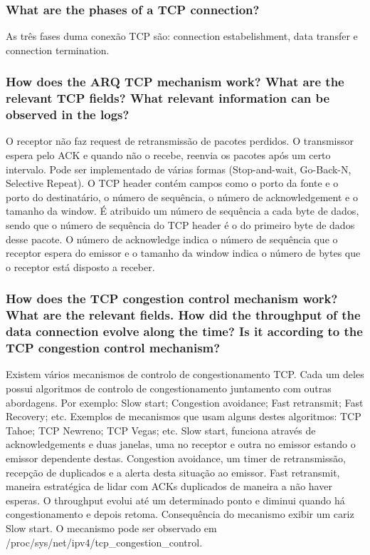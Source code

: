 \documentclass[a4paper]{article}
\begin{document}
\subsubsection{What are the phases of a TCP connection?}

As três fases duma conexão TCP são: connection estabelishment, data transfer e connection termination.

\subsubsection{How does the ARQ TCP mechanism work? What are the relevant TCP
fields? What relevant information can be observed in the logs?}

O receptor não faz request de retransmissão de pacotes perdidos. O transmissor espera pelo ACK e quando
não o recebe, reenvia os pacotes após um certo intervalo. Pode ser implementado de várias formas (Stop-and-wait, Go-Back-N,
Selective Repeat).
O TCP header contém campos como o porto da fonte e o porto do destinatário, o número de sequência, o número de acknowledgement e
o tamanho da window.
É atribuido um número de sequência a cada byte de dados, sendo que o número de sequência do TCP header é o do primeiro byte de dados desse pacote. O número de acknowledge indica o número de sequência que o receptor espera do emissor e o tamanho da window indica o número de bytes que o receptor está disposto a receber.

\subsubsection{How does the TCP congestion control mechanism work? What are the
relevant fields. How did the throughput of the data connection evolve
along the time? Is it according to the TCP congestion control mechanism?}
Existem vários mecanismos de controlo de congestionamento TCP. Cada um deles possui algoritmos de controlo de congestionamento juntamento com outras abordagens. Por exemplo: Slow start; Congestion avoidance; Fast retransmit; Fast Recovery; etc. Exemplos de mecanismos que usam alguns destes algoritmos: TCP Tahoe; TCP Newreno; TCP Vegas; etc. Slow start, funciona através de acknowledgements e duas janelas, uma no receptor e outra no emissor estando o emissor dependente destas. Congestion avoidance, um timer de retransmissão, recepção de duplicados e a alerta desta situação ao emissor. Fast retransmit, maneira estratégica de lidar com ACKs duplicados de maneira a não haver esperas. O throughput evolui até um determinado ponto e diminui quando há congestionamento e depois retoma. Consequência do mecanismo exibir um cariz Slow start. O mecanismo pode ser observado em /proc/sys/net/ipv4/tcp\_congestion\_control.
\end{document}
